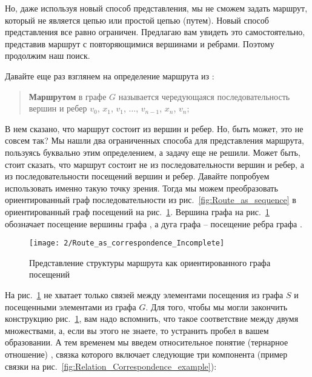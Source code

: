 Но, даже используя новый способ представления, мы не сможем задать
маршрут, который не является цепью или простой цепью (путем). Новый
способ представления все равно ограничен. Предлагаю вам увидеть это
самостоятельно, представив маршрут с повторяющимися вершинами и
ребрами. Поэтому продолжим наш поиск.

Давайте еще раз взглянем на определение маршрута из
\cite{hararigraph}:

\begin{quotation}
  \textbf{Маршрутом} в графе $G$ называется чередующаяся
  последовательность вершин и ребер $v_0$, $x_1$, $v_1$, $\dotsc$, $v_{n-1}$,
  $x_n$, $v_n$;
\end{quotation}

В нем сказано, что маршрут состоит из вершин и ребер. Но, быть может,
это не совсем так? Мы нашли два ограниченных способа для представления
маршрута, пользуясь буквально этим определением, а задачу еще не
решили. Может быть, стоит сказать, что маршрут состоит не из
последовательности вершин и ребер, а из последовательности посещений
вершин и ребер. Давайте попробуем использовать именно такую точку
зрения. Тогда мы можем преобразовать ориентированный граф
последовательности  из рис.~\ref{fig:Route_as_sequence} в
ориентированный граф посещений  на
рис.~\ref{fig:Route_as_correspondence_Incomplete}. Вершина графа
 на рис.~\ref{fig:Route_as_correspondence_Incomplete}
обозначает посещение вершины графа , а дуга графа  –
посещение ребра графа .

\begin{figure}[h!]
  \centering
  \texttt{[image: 2/Route\_as\_correspondence\_Incomplete]}
  \caption{Представление структуры  маршрута  как
    ориентированного графа посещений}
  \label{fig:Route_as_correspondence_Incomplete}
\end{figure}

На рис.~\ref{fig:Route_as_correspondence_Incomplete} не хватает только
связей между элементами посещения из графа $S$ и посещенными
элементами из графа $G$. Для того, чтобы мы могли закончить
конструкцию рис.~\ref{fig:Route_as_correspondence_Incomplete}, вам
надо вспомнить, что такое соответствие между двумя множествами, а,
если вы этого не знаете, то устранить пробел в вашем образовании. А
тем временем мы введем относительное понятие (тернарное отношение)
, связка которого включает следующие три
компонента (пример связки на
рис.~\ref{fig:Relation_Correspondence_example}):


